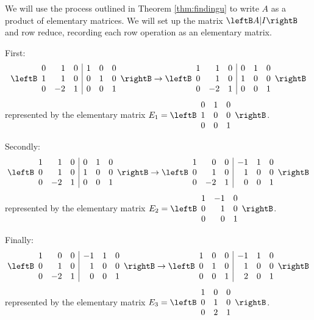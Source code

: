 \begin{solution}
We will use the process outlined in Theorem \ref{thm:findingu} to write $A$ as a product of elementary matrices. We will set up the matrix $\leftB A | I \rightB$ and row reduce, recording each row operation as an elementary matrix. 

First: 
\[
 \leftB
\begin{array}{rrr|rrr}
0 & 1 & 0 & 1 & 0 & 0 \\
1 & 1 & 0 & 0 & 1 & 0 \\
0 & -2 & 1 & 0 & 0 & 1 
\end{array} \rightB
\rightarrow 
 \leftB
\begin{array}{rrr|rrr}
1 & 1 & 0 & 0 & 1 & 0 \\
0 & 1 & 0 & 1 & 0 & 0 \\
0 & -2 & 1 & 0 & 0 & 1 
\end{array} \rightB
\]
represented by the elementary matrix $E_1= \leftB
\begin{array}{rrr}
0 & 1 & 0 \\
1 & 0 & 0 \\
0 & 0 & 1 
\end{array} \rightB$.

Secondly:
\[
\leftB
\begin{array}{rrr|rrr}
1 & 1 & 0 & 0 & 1 & 0 \\
0 & 1 & 0 & 1 & 0 & 0 \\
0 & -2 & 1 & 0 & 0 & 1 
\end{array} \rightB
\rightarrow 
 \leftB
\begin{array}{rrr|rrr}
1 & 0 & 0 & -1 & 1 & 0 \\
0 & 1 & 0 & 1 & 0 & 0 \\
0 & -2 & 1 & 0 & 0 & 1 
\end{array} \rightB
\]
represented by the elementary matrix
$E_2 =  \leftB
\begin{array}{rrr}
1 & -1 & 0 \\
0 & 1 & 0 \\
0 & 0 & 1 
\end{array} \rightB$.

Finally:
\[
\leftB
\begin{array}{rrr|rrr}
1 & 0& 0 & -1 & 1 & 0 \\
0 & 1 & 0 & 1 & 0 & 0 \\
0 & -2 & 1 & 0 & 0 & 1 
\end{array} \rightB
\rightarrow 
 \leftB
\begin{array}{rrr|rrr}
1 & 0 & 0 &-1 & 1 & 0\\
0 & 1 & 0 & 1 & 0 & 0 \\
0 & 0 & 1 & 2 & 0 & 1 
\end{array} \rightB
\]
represented by the elementary matrix $E_3=  \leftB
\begin{array}{rrr}
1 & 0 & 0 \\
0 & 1 & 0 \\
0 & 2 & 1 
\end{array} \rightB$.


\end{solution}
